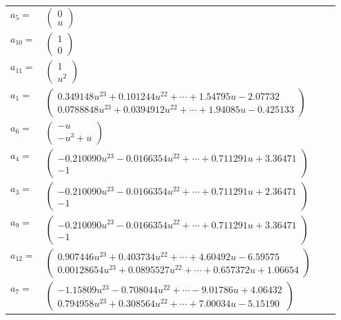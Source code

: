 \documentclass[1p]{elsarticle_modified}
\theoremstyle{definition}
\begin{document}
\begin{tabular}{m{7pt} m{180pt} m{7pt} m{180pt} }
\flushright $a_{5}=$&$\begin{pmatrix}0\\u\end{pmatrix}$ \\
\flushright $a_{10}=$&$\begin{pmatrix}1\\0\end{pmatrix}$ \\
\flushright $a_{11}=$&$\begin{pmatrix}1\\u^2\end{pmatrix}$ \\
\flushright $a_{1}=$&$\begin{pmatrix}0.349148 u^{23}+0.101244 u^{22}+\cdots+1.54795 u-2.07732\\0.0788848 u^{23}+0.0394912 u^{22}+\cdots+1.94085 u-0.425133\end{pmatrix}$ \\
\flushright $a_{6}=$&$\begin{pmatrix}- u\\- u^3+u\end{pmatrix}$ \\
\flushright $a_{4}=$&$\begin{pmatrix}-0.210090 u^{23}-0.0166354 u^{22}+\cdots+0.711291 u+3.36471\\-1\end{pmatrix}$ \\
\flushright $a_{3}=$&$\begin{pmatrix}-0.210090 u^{23}-0.0166354 u^{22}+\cdots+0.711291 u+2.36471\\-1\end{pmatrix}$ \\
\flushright $a_{9}=$&$\begin{pmatrix}-0.210090 u^{23}-0.0166354 u^{22}+\cdots+0.711291 u+3.36471\\-1\end{pmatrix}$ \\
\flushright $a_{12}=$&$\begin{pmatrix}0.907446 u^{23}+0.403734 u^{22}+\cdots+4.60492 u-6.59575\\0.00128654 u^{23}+0.0895527 u^{22}+\cdots+0.657372 u+1.06654\end{pmatrix}$ \\
\flushright $a_{7}=$&$\begin{pmatrix}-1.15809 u^{23}-0.708044 u^{22}+\cdots-9.01786 u+4.06432\\0.794958 u^{23}+0.308564 u^{22}+\cdots+7.00034 u-5.15190\end{pmatrix}$ \\

\end{tabular}
\end{document}
